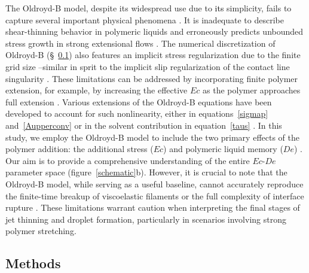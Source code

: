 \documentclass{jfm}
\newcommand{\AO}[1]{{\textcolor{black}{#1}}}
\newcommand{\oo}{\color{black} \normalfont}
\newcommand{\ooT}{\color{black} \normalfont}
\newcommand{\bb}{\color{black} \normalfont}
\begin{document}
The Oldroyd-B model, despite its widespread use due to \AO{its} simplicity, fails to capture several important physical phenomena \citep{snoeijer2020relationship}. It is inadequate to describe shear-thinning behavior in polymeric liquids \citep{yamani2023master} and erroneously predicts unbounded stress growth in strong extensional flows \citep{mckinley2002filament, eggers2020self}. \ooT The numerical discretization of Oldroyd-B (\S~\ref{sec:methods}) also features an implicit stress regularization due to the finite grid size \citep{renardy2021mathematician}--similar in sprit to the implicit slip regularization of the contact line singularity \citep{afkhamiTransitionNumericalModel2018,fullanaConsistentTreatmentDynamic2024}.\bb
These limitations can be addressed by incorporating finite polymer extension, for example, by increasing the effective $Ec$ as the polymer approaches full extension \citep{hinch2021oldroyd,zinelis2023transition}. Various extensions of the Oldroyd-B equations have been developed to account for such nonlinearity, either in equations~\eqref{sigmap} and~\eqref{Aupperconv} or in the solvent contribution in equation~\eqref{taus} \citep{de1974coil,tanner2000engineering,mckinley2002filament,alves2021numerical}. In this study, we employ the Oldroyd-B model to include the two primary effects of the polymer addition: the additional stress ($Ec$) and polymeric liquid memory ($De$) \citep{snoeijer2020relationship}. Our aim is to provide a comprehensive understanding of the entire $Ec$-$De$ parameter space (figure~\ref{schematic}b).
\oo 
However, it is crucial to note that the Oldroyd-B model, while serving as a useful baseline, cannot accurately reproduce the finite-time breakup of viscoelastic filaments \citep{eggers2020self} or the full complexity of interface rupture \citep{lohse-2020-pnas}. These limitations warrant caution when interpreting the final stages of jet thinning and droplet formation, particularly in scenarios involving strong polymer stretching.
\bb


\subsection {Methods}\label{sec:methods}
\end{document}
